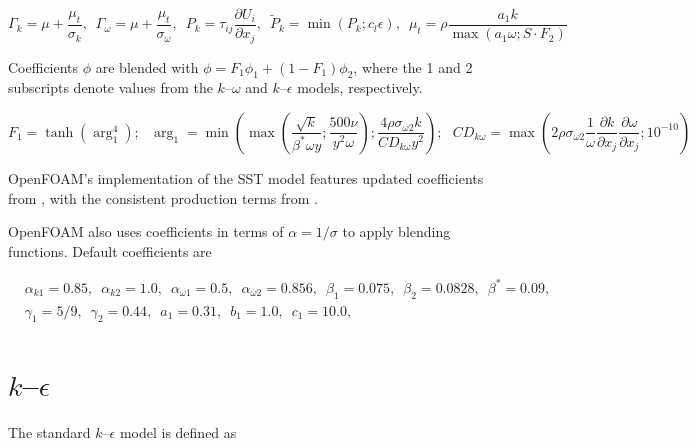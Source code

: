 \begin{equation}
    \Gamma_k = \mu + \frac{\mu_t}{\sigma_k}, \, \, \,
    \Gamma_\omega = \mu + \frac{\mu_t}{\sigma_\omega}, \, \, \,
    P_k = \tau_{ij} \frac{\partial U_i}{\partial x_j}, \, \, \,
    \tilde{P}_k = \min(P_k;c_l \epsilon), \, \, \,
    \mu_t = \rho \frac{a_1 k}{\max(a_1 \omega; S \cdot F_2)}
\end{equation}

Coefficients $\phi$ are blended with $\phi = F_1 \phi_1 + (1 - F_1) \phi_2$,
where the 1 and 2 subscripts denote values from the $k$--$\omega$ and
$k$--$\epsilon$ models, respectively.

\begin{equation}
    F_1 = \tanh (\arg_1^4); \, \, \, \,
    \arg_1 = \min
    \left(
    \max
    \left(
    \frac{\sqrt{k}}{\beta^* \omega y};
    \frac{500 \nu}{y^2 \omega}
    \right);
    \frac{4 \rho \sigma_{\omega2} k}{CD_{k \omega} y^2}
    \right); \, \, \, \,
    CD_{k \omega} = \max
    \left(
    2 \rho \sigma_{\omega 2} \frac{1}{\omega}
    \frac{\partial k}{\partial x_j}
    \frac{\partial \omega}{\partial x_j};
    10^{-10}
    \right)
\end{equation}

OpenFOAM's implementation of the SST model features updated coefficients from
\cite{Menter2003}, with the consistent production terms from \cite{Menter2001}.

OpenFOAM also uses coefficients in terms of $\alpha = 1/\sigma$ to apply
blending functions. Default coefficients are

\begin{equation}
\begin{split}
&   \alpha_{k1} = 0.85, \, \, \,
    \alpha_{k2} = 1.0, \, \, \,
    \alpha_{\omega1} = 0.5, \, \, \,
    \alpha_{\omega2} = 0.856, \, \, \,
    \beta_1 = 0.075, \, \, \,
    \beta_2 = 0.0828, \, \, \,
    \beta^* = 0.09, \, \, \, \\
&   \gamma_1 = 5/9, \, \, \,
    \gamma_2 = 0.44, \, \, \,
    a_1 = 0.31, \, \, \,
    b_1 = 1.0, \, \, \,
    c_1 = 10.0, \, \, \,
\end{split}
\end{equation}



\section{$k$--$\epsilon$}

The standard $k$--$\epsilon$ model is defined as \cite{Wilcox1994}

